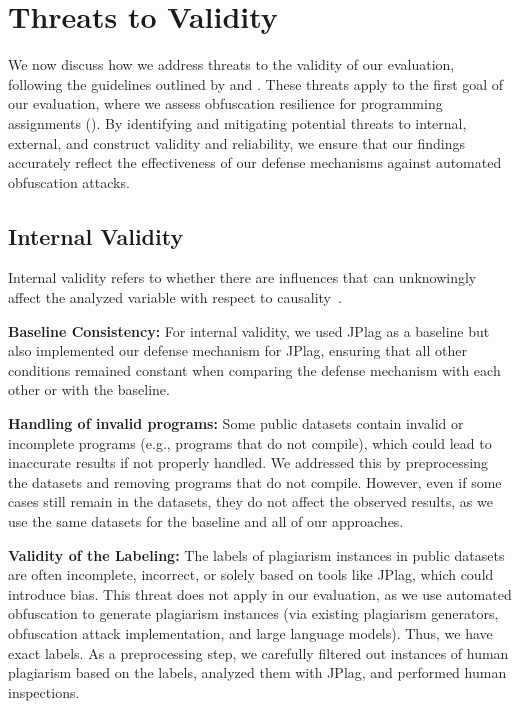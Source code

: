 \section{Threats to Validity}
We now discuss how we address threats to the validity of our evaluation, following the guidelines outlined by \citet{Wohlin2012} and \citet{runeson2008}. These threats apply to the first goal of our evaluation, where we assess obfuscation resilience for programming assignments (). By identifying and mitigating potential threats to internal, external, and construct validity and reliability, we ensure that our findings accurately reflect the effectiveness of our defense mechanisms against automated obfuscation attacks.

\subsection{Internal Validity} 
Internal validity refers to whether there are influences that can unknowingly affect the analyzed variable with respect to causality~\cite{Wohlin2012}.
%

    \textbf{Baseline Consistency:} For internal validity, we used JPlag as a baseline but also implemented our defense mechanism for JPlag, ensuring that all other conditions remained constant when comparing the defense mechanism with each other or with the baseline. 

    \textbf{Handling of invalid programs:} Some public datasets contain invalid or incomplete programs (e.g., programs that do not compile), which could lead to inaccurate results if not properly handled. We addressed this by preprocessing the datasets and removing programs that do not compile. However, even if some cases still remain in the datasets, they do not affect the observed results, as we use the same datasets for the baseline and all of our approaches. 

    \textbf{Validity of the Labeling:} The labels of plagiarism instances in public datasets are often incomplete, incorrect, or solely based on tools like JPlag, which could introduce bias. This threat does not apply in our evaluation, as we use automated obfuscation to generate plagiarism instances (via existing plagiarism generators, obfuscation attack implementation, and large language models). Thus, we have exact labels. As a preprocessing step, we carefully filtered out instances of human plagiarism based on the labels, analyzed them with JPlag, and performed human inspections.

